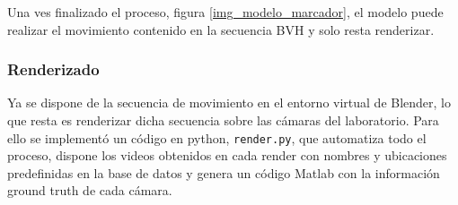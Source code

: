 Una ves finalizado el proceso, figura \ref{img_modelo_marcador},  el modelo puede realizar el movimiento contenido en la secuencia BVH y solo resta renderizar. 

\subsubsection*{Renderizado} 

Ya se dispone de la secuencia de movimiento en el entorno virtual de Blender, lo que resta es renderizar dicha secuencia sobre las cámaras del laboratorio. Para ello se implementó un código en python, \texttt{render.py},  que automatiza todo el proceso, dispone los videos obtenidos en cada render con nombres y ubicaciones predefinidas en la base de datos y genera un código Matlab con la información ground truth de cada cámara. 


